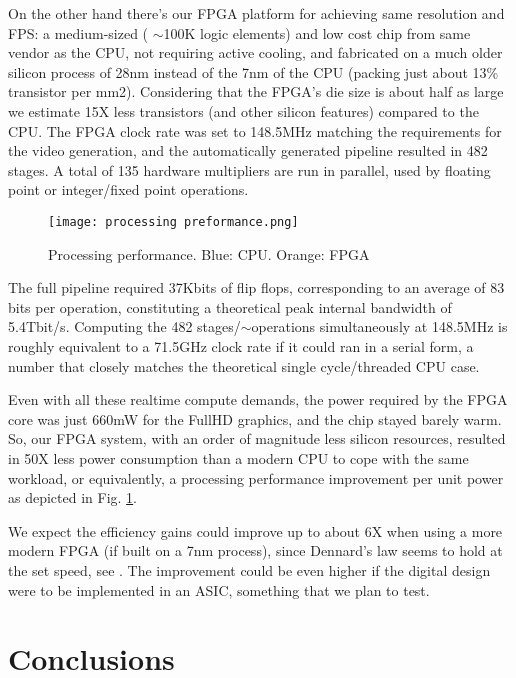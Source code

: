 \documentclass[conference]{IEEEtran}
\begin{document}
On the other hand there’s our FPGA platform for achieving same resolution and FPS: a medium-sized ( $\sim$100K logic elements) and low cost chip from same vendor as the CPU, not requiring active cooling, and fabricated on a much older silicon process of 28nm instead of the 7nm of the CPU (packing just about 13\% transistor per mm2). Considering that the FPGA’s die size is about half as large we estimate 15X less transistors (and other silicon features) compared to the CPU. The FPGA clock rate was set to 148.5MHz matching the requirements for the video generation, and the automatically generated pipeline resulted in 482 stages. A total of 135 hardware multipliers are run in parallel, used by floating point or integer/fixed point operations.

\begin{figure}
\texttt{[image: processing preformance.png]}
\caption{Processing performance. Blue: CPU. Orange: FPGA}
\label{figperf}
\end{figure}

The full pipeline required 37Kbits of flip flops, corresponding to an average of 83 bits per operation, constituting a theoretical peak internal bandwidth of 5.4Tbit/s. Computing the 482 stages/$\sim$operations simultaneously at 148.5MHz is roughly equivalent to a 71.5GHz clock rate if it could ran in a serial form, a number that closely matches the theoretical single cycle/threaded CPU case.


Even with all these realtime compute demands, the power required by the FPGA core was just 660mW for the FullHD graphics, and the chip stayed barely warm. So, our FPGA system, with an order of magnitude less silicon resources, resulted in 50X less power consumption than a modern CPU to cope with the same workload, or equivalently, a processing performance improvement per unit power as depicted in Fig. \ref{figperf}.

We expect the efficiency gains could improve up to about 6X when using a more modern FPGA (if built on a 7nm process), since Dennard's law seems to hold at the set speed, see \cite{dennard}. The improvement could be even higher if the digital design were to be implemented in an ASIC, something that we plan to test.
\\

\section{Conclusions}
\end{document}
